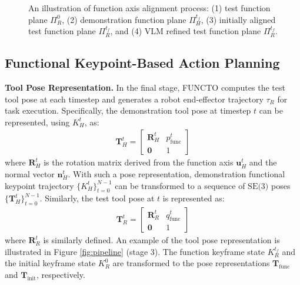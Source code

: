  \begin{figure}[t]
  \centering
  \hspace*{-0.3in}
    \vspace*{-0.3in}
  \caption{An illustration of function axis alignment process: (1) test function plane \( \Pi_R^0 \), (2) demonstration function plane  \( \Pi_H^{t_f} \), (3) initially aligned test function plane  \( \Pi_R^{t_f} \), and (4) VLM refined test function plane  \( \Pi_R^{t_f} \).}
  \label{fig:func_axis_align}
  \vspace*{-0.25in}
\end{figure}


\subsection{Functional Keypoint-Based Action Planning}\label{planning}
\noindent \textbf{Tool Pose Representation.} In the final stage, FUNCTO computes the test tool pose at each timestep and generates a robot end-effector trajectory $\tau_R$ for task execution. Specifically, the demonstration tool pose at timestep $t$ can be represented, using $K_H^t$, as:
\begin{align*}
     \mathbf{T}_H^t =
\begin{bmatrix}
\mathbf{R}_H^t & p_{\text{func}}^t \\
\mathbf{0} & 1
\end{bmatrix}\end{align*}
where $\mathbf{R}_H^t$ is the rotation matrix derived from the function axis $\mathbf{u}_H^t$ and the normal vector $ \mathbf{n}_H^t$. With such a pose representation, demonstration functional keypoint trajectory $\{K_H^t\}_{t=0}^{N-1}$ can be transformed to a sequence of $\text{SE(3)}$ poses $\{\mathbf{T}_H^t\}_{t=0}^{N-1}$. Similarly, the test tool pose at $t$ is represented as:
\begin{align*}
\mathbf{T}_R^t =
\begin{bmatrix}
\mathbf{R}_R^t & q_{\text{func}}^t \\
\mathbf{0} & 1
\end{bmatrix}
\end{align*}
where $\mathbf{R}_R^t$ is similarly defined. An example of the tool pose representation is illustrated in Figure \ref{fig:pipeline} (stage 3). The function keyframe state $K_R^{t_f}$ and the initial keyframe state $K_R^{0}$ are transformed to the pose representations $\mathbf{T}_{\text{func}}$ and $\mathbf{T}_{\text{init}}$, respectively. \\

